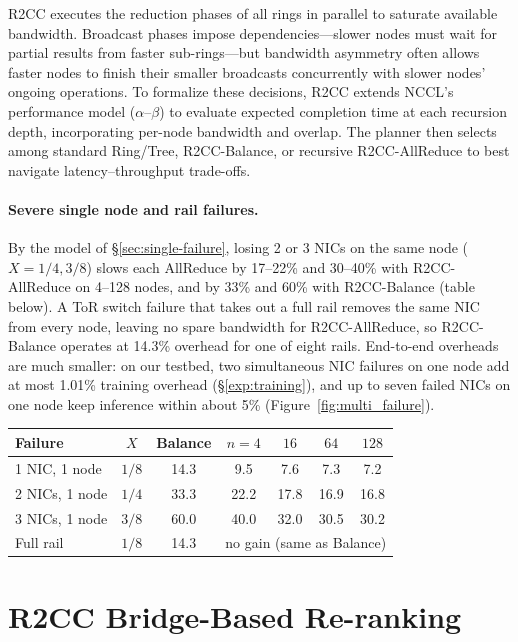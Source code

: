 \documentclass[letterpaper,twocolumn,10pt]{article}
\begin{document}
R2CC executes the reduction phases of all rings in parallel to saturate available bandwidth. Broadcast phases impose dependencies—slower nodes must wait for partial results from faster sub-rings—but bandwidth asymmetry often allows faster nodes to finish their smaller broadcasts concurrently with slower nodes' ongoing operations. To formalize these decisions, R2CC extends NCCL’s performance model ($\alpha$–$\beta$) to evaluate expected completion time at each recursion depth, incorporating per-node bandwidth and overlap. The planner then selects among standard Ring/Tree, R2CC-Balance, or recursive R2CC-AllReduce to best navigate latency–throughput trade-offs.

\paragraph{Severe single node and rail failures.} By the model of \S\ref{sec:single-failure}, losing 2 or 3 NICs on the same node ($X=1/4, 3/8$) slows each AllReduce by 17--22\% and 30--40\% with R2CC-AllReduce on 4--128 nodes, and by 33\% and 60\% with R2CC-Balance (table below). A ToR switch failure that takes out a full rail removes the same NIC from every node, leaving no spare bandwidth for R2CC-AllReduce, so R2CC-Balance operates at 14.3\% overhead for one of eight rails. End-to-end overheads are much smaller: on our testbed, two simultaneous NIC failures on one node add at most 1.01\% training overhead (\S\ref{exp:training}), and up to seven failed NICs on one node keep inference within about 5\% (Figure~\ref{fig:multi_failure}).

\begin{center}
\small
\setlength{\tabcolsep}{4pt}
\begin{tabular}{lcccccc}
\toprule
Failure & $X$ & Balance & $n{=}4$ & $16$ & $64$ & $128$ \\
\midrule
1 NIC, 1 node & $1/8$ & 14.3 & 9.5 & 7.6 & 7.3 & 7.2 \\
2 NICs, 1 node & $1/4$ & 33.3 & 22.2 & 17.8 & 16.9 & 16.8 \\
3 NICs, 1 node & $3/8$ & 60.0 & 40.0 & 32.0 & 30.5 & 30.2 \\
Full rail & $1/8$ & 14.3 & \multicolumn{4}{c}{no gain (same as Balance)} \\
\bottomrule
\end{tabular}
\end{center}

\section{R2CC Bridge-Based Re-ranking}
\label{app:bridge-based}
\end{document}
